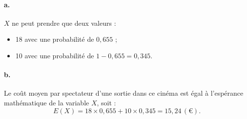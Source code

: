 \documentclass[10pt]{article}
\begin{document}
\paragraph{a.} \( X \) ne peut prendre que deux valeurs :

\begin{itemize}
  \item 18 avec une probabilité de \(0{,}655\) ;
  \item 10 avec une probabilité de \( 1 - 0{,}655 = 0{,}345 \).
\end{itemize}

\paragraph{b.} Le coût moyen par spectateur d'une sortie dans ce cinéma est égal à l'espérance mathématique de la variable \( X \), soit :
\[
E(X) = 18 \times 0{,}655 + 10 \times 0{,}345 = 15{,}24 \, (\text{€}).
\]
\end{document}
